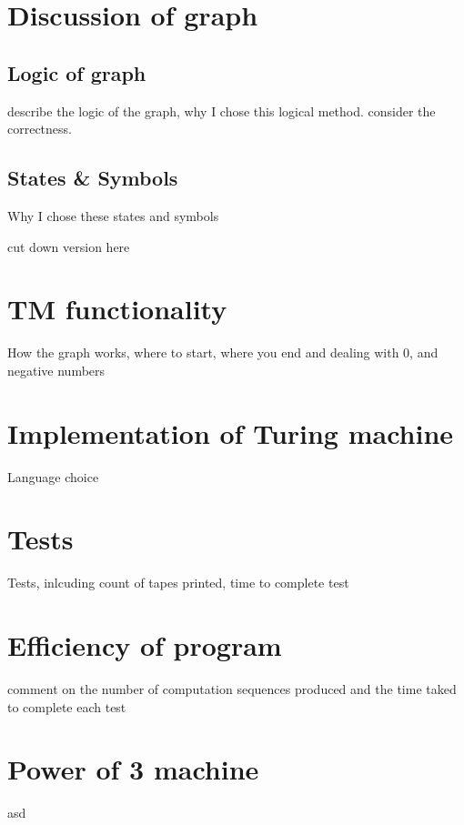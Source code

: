 \documentclass[11pt]{article}
\begin{document}
\section{Discussion of graph}
\subsection{Logic of graph}
describe the logic of the graph, why I chose this logical method. consider the correctness.
\subsection{States \& Symbols}
Why I chose these states and symbols

cut down version here
\section{TM functionality}
How the graph works, where to start, where you end and dealing with 0, and negative numbers
\section{Implementation of Turing machine}
Language choice
\section{Tests}
Tests, inlcuding count of tapes printed, time to complete test
\section{Efficiency of program}
comment on the number of computation sequences produced and the time taked to complete each test
\section{Power of 3 machine}
asd
\end{document}

